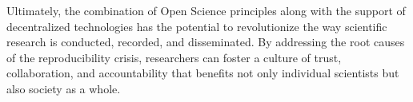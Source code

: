 Ultimately, the combination of Open Science principles along with the support of decentralized technologies has the potential to revolutionize the way scientific research is conducted, recorded, and disseminated. By addressing the root causes of the reproducibility crisis, researchers can foster a culture of trust, collaboration, and accountability that benefits not only individual scientists but also society as a whole.



